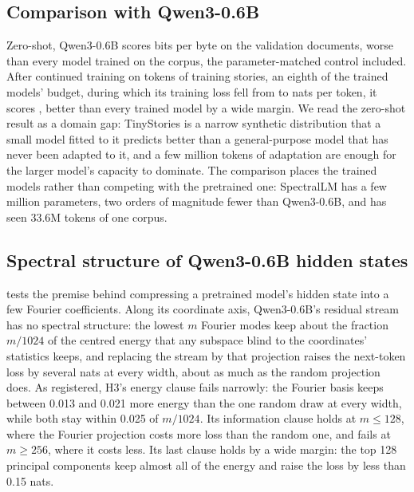 \ExtProse{}

\subsection{Comparison with Qwen3-0.6B}
\label{sec:res-qwen}



Zero-shot, Qwen3-0.6B scores \BpbQwen{} bits per byte on the validation
documents, worse than every model trained on the corpus, the
parameter-matched control included. After continued training on
\QwenFtTokens{} tokens of training stories, an eighth of the trained models'
budget, during which its training loss fell from \QwenFtLossFrom{} to
\QwenFtLossTo{} nats per token, it scores \BpbQwenFt{}, better than every
trained model by a wide margin. We read the zero-shot result as a domain gap:
TinyStories is a narrow synthetic distribution that a small model fitted to it
predicts better than a general-purpose model that has never been adapted to
it, and a few million tokens of adaptation are enough for the larger model's
capacity to dominate. The comparison places the trained models rather than
competing with the pretrained one: SpectralLM has a few million parameters,
two orders of magnitude fewer than Qwen3-0.6B, and has seen 33.6M tokens of one
corpus.

\subsection{Spectral structure of Qwen3-0.6B hidden states}
\label{sec:res-compress}



 tests the premise behind compressing a pretrained
model's hidden state into a few Fourier coefficients. Along its coordinate
axis, Qwen3-0.6B's residual stream has no spectral structure: the lowest
$m$ Fourier modes keep about the fraction $m/1024$ of the centred energy that
any subspace blind to the coordinates' statistics keeps, and replacing the
stream by that projection raises the next-token loss by several nats at every
width, about as much as the random projection does. As registered, H3's
energy clause fails narrowly: the Fourier basis keeps between 0.013 and 0.021
more energy than the one random draw at every width, while both stay within
0.025 of $m/1024$. Its information clause holds at $m\le128$, where the
Fourier projection costs more loss than the random one, and fails at
$m\ge256$, where it costs less. Its last clause holds by a wide margin: the
top 128 principal components keep almost all of the energy and raise the
loss by less than 0.15 nats.

